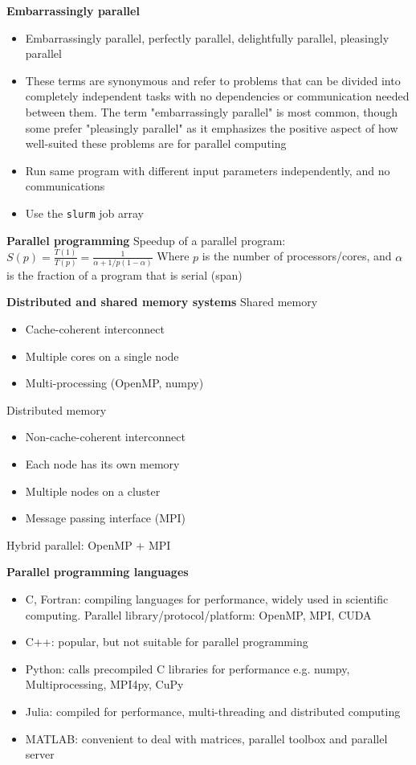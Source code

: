 \textbf{Embarrassingly parallel}
\begin{itemize}
    \item Embarrassingly parallel, perfectly parallel, delightfully parallel, pleasingly parallel
    \item These terms are synonymous and refer to problems that can be divided into completely independent tasks with no dependencies or communication needed between them. The term "embarrassingly parallel" is most common, though some prefer "pleasingly parallel" as it emphasizes the positive aspect of how well-suited these problems are for parallel computing
    \item Run same program with different input parameters independently, and no communications
    \item Use the \texttt{slurm} job array
\end{itemize}

\textbf{Parallel programming}
Speedup of a parallel program: $S(p) = \frac{T(1)}{T(p)} = \frac{1}{\alpha + 1/p (1-\alpha)}$
Where $p$ is the number of processors/cores, and $\alpha$ is the fraction of a program that is serial (span)

\textbf{Distributed and shared memory systems}
Shared memory
\begin{itemize}
    \item Cache-coherent interconnect
    \item Multiple cores on a single node
    \item Multi-processing (OpenMP, numpy)
\end{itemize}

Distributed memory
\begin{itemize}
    \item Non-cache-coherent interconnect
    \item Each node has its own memory
    \item Multiple nodes on a cluster
    \item Message passing interface (MPI)
\end{itemize}

Hybrid parallel: OpenMP + MPI

\textbf{Parallel programming languages}
\begin{itemize}
    \item C, Fortran: compiling languages for performance, widely used in scientific computing. Parallel library/protocol/platform: OpenMP, MPI, CUDA
    \item C++: popular, but not suitable for parallel programming
    \item Python: calls precompiled C libraries for performance e.g. numpy, Multiprocessing, MPI4py, CuPy
    \item Julia: compiled for performance, multi-threading and distributed computing
    \item MATLAB: convenient to deal with matrices, parallel toolbox and parallel server
\end{itemize}

